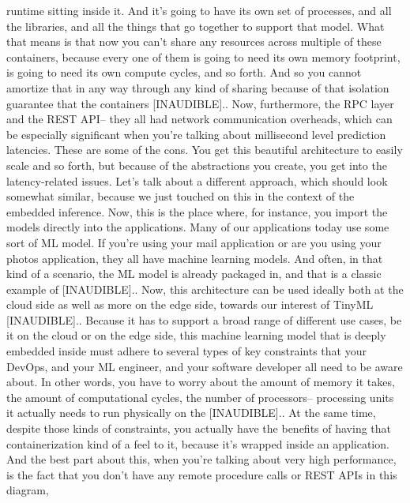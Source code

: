 {{{{{{{     runtime sitting inside it.
     And it's going to have its own set of processes, and all the libraries,
     and all the things that go together to support that model.
     What that means is that now you can't share any resources across multiple
     of these containers, because every one of them
     is going to need its own memory footprint,
     is going to need its own compute cycles, and so forth.
     And so you cannot amortize that in any way through any kind of sharing
     because of that isolation guarantee that the containers [INAUDIBLE]..
     Now, furthermore, the RPC layer and the REST
     API-- they all had network communication overheads, which
     can be especially significant when you're talking about millisecond level
     prediction latencies.
     These are some of the cons.
     You get this beautiful architecture to easily scale and so forth,
     but because of the abstractions you create,
     you get into the latency-related issues.
     Let's talk about a different approach, which
     should look somewhat similar, because we just
     touched on this in the context of the embedded inference.
     Now, this is the place where, for instance, you import the models
     directly into the applications.
     Many of our applications today use some sort of ML model.
     If you're using your mail application or are you using your photos application,
     they all have machine learning models.
     And often, in that kind of a scenario, the ML model is already packaged in,
     and that is a classic example of [INAUDIBLE]..
     Now, this architecture can be used ideally
     both at the cloud side as well as more on the edge side,
     towards our interest of TinyML [INAUDIBLE]..
     Because it has to support a broad range of different use cases,
     be it on the cloud or on the edge side, this machine
     learning model that is deeply embedded inside
     must adhere to several types of key constraints
     that your DevOps, and your ML engineer, and your software developer
     all need to be aware about.
     In other words, you have to worry about the amount of memory it takes,
     the amount of computational cycles, the number of processors--
     processing units it actually needs to run physically on the [INAUDIBLE]..
     At the same time, despite those kinds of constraints,
     you actually have the benefits of having that containerization kind of a feel
     to it, because it's wrapped inside an application.
     And the best part about this, when you're
     talking about very high performance, is the fact
     that you don't have any remote procedure calls or REST APIs in this diagram,
}}}}}}}
